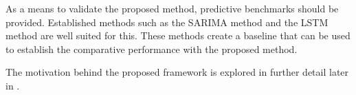 As a means to validate the proposed method, predictive benchmarks should be provided.
Established methods such as the SARIMA method and the LSTM method are well suited for this.
These methods create a baseline that can be used to establish the comparative performance with the proposed method.

The motivation behind the proposed framework is explored in further detail later in .

